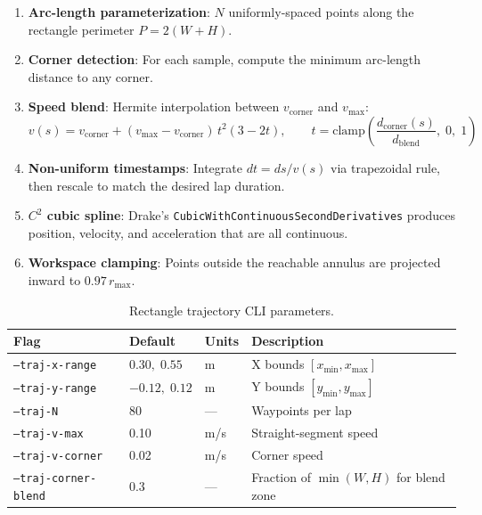 \documentclass[11pt,a4paper]{article}
\begin{document}
\begin{enumerate}[leftmargin=2em]
    \item \textbf{Arc-length parameterization}: $N$ uniformly-spaced points along the rectangle perimeter $P = 2(W + H)$.
    \item \textbf{Corner detection}: For each sample, compute the minimum arc-length distance to any corner.
    \item \textbf{Speed blend}: Hermite interpolation between $v_{\mathrm{corner}}$ and $v_{\mathrm{max}}$:
    \[
        v(s) = v_{\mathrm{corner}} + (v_{\mathrm{max}} - v_{\mathrm{corner}})\,t^2(3 - 2t),
        \qquad t = \mathrm{clamp}\!\left(\frac{d_{\mathrm{corner}}(s)}{d_{\mathrm{blend}}},\; 0,\; 1\right)
    \]
    \item \textbf{Non-uniform timestamps}: Integrate $dt = ds / v(s)$ via trapezoidal rule, then rescale to match the desired lap duration.
    \item \textbf{$C^2$ cubic spline}: Drake's \texttt{CubicWithContinuousSecondDerivatives} produces position, velocity, and acceleration that are all continuous.
    \item \textbf{Workspace clamping}: Points outside the reachable annulus are projected inward to $0.97\,r_{\mathrm{max}}$.
\end{enumerate}

\begin{table}[H]
\centering
\caption{Rectangle trajectory CLI parameters.}
\begin{tabular}{llll}
\toprule
\textbf{Flag} & \textbf{Default} & \textbf{Units} & \textbf{Description} \\
\midrule
\texttt{--traj-x-range}      & $0.30,\; 0.55$ & m     & X bounds $[x_{\min}, x_{\max}]$ \\
\texttt{--traj-y-range}      & $-0.12,\; 0.12$ & m    & Y bounds $[y_{\min}, y_{\max}]$ \\
\texttt{--traj-N}            & 80              & ---   & Waypoints per lap \\
\texttt{--traj-v-max}        & 0.10            & m/s   & Straight-segment speed \\
\texttt{--traj-v-corner}     & 0.02            & m/s   & Corner speed \\
\texttt{--traj-corner-blend} & 0.3             & ---   & Fraction of $\min(W,H)$ for blend zone \\
\bottomrule
\end{tabular}
\end{table}
\end{document}

